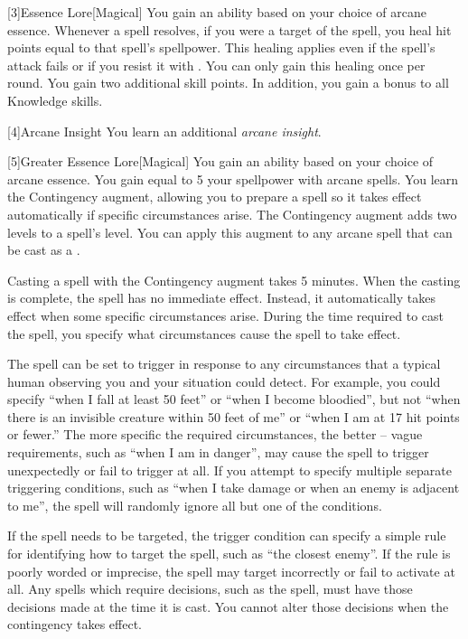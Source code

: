         [3]{Essence Lore}[Magical]
        You gain an ability based on your choice of arcane essence.
         Whenever a spell resolves, if you were a target of the spell, you heal hit points equal to that spell's spellpower.
        This healing applies even if the spell's attack fails or if you resist it with .
        You can only gain this healing once per round.
         You gain two additional skill points.
        In addition, you gain a  bonus to all Knowledge skills.

        [4]{Arcane Insight}
        You learn an additional \textit{arcane insight}.

        [5]{Greater Essence Lore}[Magical]
        You gain an ability based on your choice of arcane essence.
         You gain  equal to 5 \add your spellpower with arcane spells.
         You learn the Contingency augment, allowing you to prepare a spell so it takes effect automatically if specific circumstances arise.
        The Contingency augment adds two levels to a spell's level.
        You can apply this augment to any arcane spell that can be cast as a .

        Casting a spell with the Contingency augment takes 5 minutes.
        When the casting is complete, the spell has no immediate effect.
        Instead, it automatically takes effect when some specific circumstances arise.
        During the time required to cast the spell, you specify what circumstances cause the spell to take effect.

        The spell can be set to trigger in response to any circumstances that a typical human observing you and your situation could detect.
        For example, you could specify ``when I fall at least 50 feet'' or ``when I become bloodied'', but not ``when there is an invisible creature within 50 feet of me'' or ``when I am at 17 hit points or fewer.''
        The more specific the required circumstances, the better -- vague requirements, such as ``when I am in danger'', may cause the spell to trigger unexpectedly or fail to trigger at all.
        If you attempt to specify multiple separate triggering conditions, such as ``when I take damage or when an enemy is adjacent to me'', the spell will randomly ignore all but one of the conditions.

        If the spell needs to be targeted, the trigger condition can specify a simple rule for identifying how to target the spell, such as ``the closest enemy''.
        If the rule is poorly worded or imprecise, the spell may target incorrectly or fail to activate at all.
        Any spells which require decisions, such as the  spell, must have those decisions made at the time it is cast.
        You cannot alter those decisions when the contingency takes effect.

